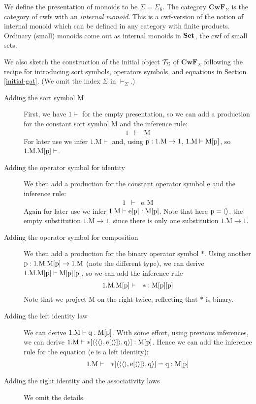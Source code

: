 \documentclass{lmcs}
\newcommand{\FYI}[1]{{\color{red}#1}}
\def\Cwf{\mathbf{CwF}}
\def\Mon{\mathrm{M}}
\def\idmon{\mathrm{e}}
\def\comp{\mathrm{*}}
\begin{document}
We define the \FYI{presentation of} monoids to be $\Sigma = \Sigma_6$. The category $\Cwf_\Sigma$ is the category of cwfs with an {\em internal monoid}. This is a cwf-version of the notion of internal monoid which can be defined in any category with finite products. Ordinary (small) monoids come out as internal monoids in ${\bf Set}$, the cwf of small sets.


We also sketch the construction of the initial object ${\mathcal T}_\Sigma$ of $\Cwf_\Sigma$ following the recipe for introducing sort symbols, operators symbols, and equations in Section \ref{initial-gat}. (We omit the index $\Sigma$ in $\vdash_\Sigma$.)
\begin{description}
\item[Adding the sort symbol $\Mon$]
First, we have $1 \vdash$ for the empty \FYI{presentation}, so we can
add a production for the constant sort symbol $\Mon$ and the inference rule:
\begin{eqnarray*}
1 &\vdash& \Mon
\end{eqnarray*}
For later use we infer $1.\Mon \vdash$ and, using $\p:1.\Mon \to 1$, $1.\Mon\vdash\Mon[\p]$,
so $1.\Mon.\Mon[\p] \vdash$.
\item[Adding the operator symbol for identity]
We then add a production for the constant operator symbol $\idmon$ and the inference rule:
\begin{eqnarray*}
1 &\vdash& \idmon : \Mon
\end{eqnarray*}
Again for later use we infer $1.\Mon\vdash \idmon[\p] :\Mon[\p]$.
Note that here $\mathrm{p} = \langle  \rangle$, the empty substitution $1.\Mon \to 1$,
since there is only one substitution $1.\Mon \to 1$.
\item[Adding the operator symbol for composition]
We then add a production for the binary operator symbol $\comp$.
Using another $\p: 1.\Mon.\Mon[\p] \to 1.\Mon$ (note the different type),
we can derive $1.\Mon.\Mon[\p] \vdash \Mon[\p][\p]$, so we can add the inference rule
\begin{eqnarray*}
1.\Mon.\Mon[\p] &\vdash& \comp : \Mon[\p][\p]
\end{eqnarray*}
Note that we project $\Mon$ on the right twice, reflecting that $\comp$ is binary.
\item[Adding the left identity law]
We can derive $1.\Mon \vdash \q : \Mon[\p]$. With some effort,
using previous inferences, we can  derive
$1.\Mon \vdash \comp[\tuple{\tuple{\tuple{},\idmon[\tuple{}]},\q}] : \Mon[\p]$.
Hence we can add the inference rule for the equation ($\idmon$ is a left identity):
\begin{eqnarray*}
1.\Mon &\vdash& \comp[\tuple{\tuple{\tuple{},\idmon[\tuple{}]},\q}] = \q : \Mon[\p]
\end{eqnarray*}
\item[Adding the right identity and the associativity laws]
We omit the details.
\end{description}
\end{document}
